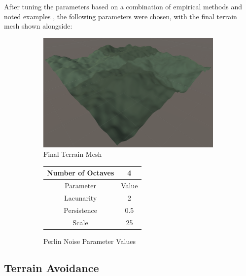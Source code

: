 \documentclass{article}
\begin{document}
After tuning the parameters based on a combination of empirical methods and noted examples \cite[pg.3-4]{Etherington}, the following parameters were chosen, with the final terrain mesh shown alongside:

\begin{figure}[ht]
    \centering
    \begin{subfigure}{0.4\textwidth}
        \centering
        \includegraphics[width=\linewidth]{lacunarity2.png}
        \caption{Final Terrain Mesh}
        \label{fig:final}
    \end{subfigure}
    \hfill
    \begin{subfigure}{0.4\textwidth}
        \centering
        \begin{tabular}{|c|c|}
            \hline
            Number of Octaves & 4 \\
            \hline
            Parameter & Value \\
            \hline
            Lacunarity & 2 \\
            \hline
            Persistence & 0.5 \\
            \hline
            Scale & 25 \\
            \hline
        \end{tabular}
        \caption{Perlin Noise Parameter Values}
        \label{tab:parameter-values}
    \end{subfigure}
    \caption{}
    \label{fig:parameter-values-lacunarity2}
\end{figure}

\subsection{Terrain Avoidance}
\label{sec:terrain-avoidance}
\end{document}
